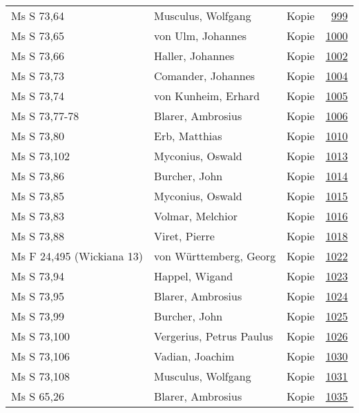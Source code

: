\documentclass[10pt,a4paper,landscape]{report}
\begin{document}
\begin{longtable}{p{16cm}p{4cm}lr}
Ms S 73,64	&	Musculus, Wolfgang	&	Kopie	&	\href{http://130.60.24.72/assignment/999}{999}\\
Ms S 73,65	&	von Ulm, Johannes	&	Kopie	&	\href{http://130.60.24.72/assignment/1000}{1000}\\
Ms S 73,66	&	Haller, Johannes	&	Kopie	&	\href{http://130.60.24.72/assignment/1002}{1002}\\
Ms S 73,73	&	Comander, Johannes	&	Kopie	&	\href{http://130.60.24.72/assignment/1004}{1004}\\
Ms S 73,74	&	von Kunheim, Erhard	&	Kopie	&	\href{http://130.60.24.72/assignment/1005}{1005}\\
Ms S 73,77-78	&	Blarer, Ambrosius	&	Kopie	&	\href{http://130.60.24.72/assignment/1006}{1006}\\
Ms S 73,80	&	Erb, Matthias	&	Kopie	&	\href{http://130.60.24.72/assignment/1010}{1010}\\
Ms S 73,102	&	Myconius, Oswald	&	Kopie	&	\href{http://130.60.24.72/assignment/1013}{1013}\\
Ms S 73,86	&	Burcher, John	&	Kopie	&	\href{http://130.60.24.72/assignment/1014}{1014}\\
Ms S 73,85	&	Myconius, Oswald	&	Kopie	&	\href{http://130.60.24.72/assignment/1015}{1015}\\
Ms S 73,83	&	Volmar, Melchior	&	Kopie	&	\href{http://130.60.24.72/assignment/1016}{1016}\\
Ms S 73,88	&	Viret, Pierre	&	Kopie	&	\href{http://130.60.24.72/assignment/1018}{1018}\\
Ms F 24,495 (Wickiana 13)	&	von Württemberg, Georg	&	Kopie	&	\href{http://130.60.24.72/assignment/1022}{1022}\\
Ms S 73,94	&	Happel, Wigand	&	Kopie	&	\href{http://130.60.24.72/assignment/1023}{1023}\\
Ms S 73,95	&	Blarer, Ambrosius	&	Kopie	&	\href{http://130.60.24.72/assignment/1024}{1024}\\
Ms S 73,99	&	Burcher, John	&	Kopie	&	\href{http://130.60.24.72/assignment/1025}{1025}\\
Ms S 73,100	&	Vergerius, Petrus Paulus	&	Kopie	&	\href{http://130.60.24.72/assignment/1026}{1026}\\
Ms S 73,106	&	Vadian, Joachim	&	Kopie	&	\href{http://130.60.24.72/assignment/1030}{1030}\\
Ms S 73,108	&	Musculus, Wolfgang	&	Kopie	&	\href{http://130.60.24.72/assignment/1031}{1031}\\
Ms S 65,26	&	Blarer, Ambrosius	&	Kopie	&	\href{http://130.60.24.72/assignment/1035}{1035}\\

\end{longtable}
\end{document}
